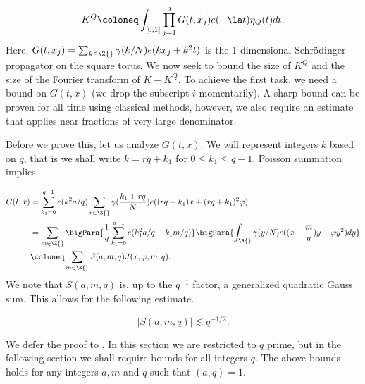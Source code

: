 \documentclass[11pt]{amsart}
\begin{document}
\begin{equation*}
    K^Q\coloneq \int_{[0,1]}\prod_{j=1}^d G(t,x_j)e(-\la t)\eta_Q(t)dt.
\end{equation*}
Here, $G(t,x_j) = \sum_{k\in\Z{}}\gamma(k/N)e(kx_j+k^2t)$ is the 1-dimensional Schr\"odinger propagator on the square torus. We now seek to bound the size of $K^{Q}$ and the size of the Fourier transform of $K - K^{Q}$. To achieve the first task, we need a bound on $G(t,x)$ (we drop the subscript $i$ momentarily). A sharp bound can be proven for all time using classical methods, however, we also require an estimate that applies near fractions of very large denominator. 


Before we prove this, let us analyze $G(t,x)$. We will represent integers $k$ based on $q$, that is we shall write $k = rq+k_1$ for $0\leq k_1\leq q-1$. Poisson summation implies

    \begin{align*}
        G(t,x)& = \sum_{k_1=0}^{q-1}e(k_1^2a/q)\sum_{r\in\Z{}}\gamma(\frac{k_1+rq}{N})e((rq+k_1)x+(rq+k_1)^2\varphi)\\
        & = \sum_{m\in\Z{}}\bigPara{\frac{1}{q}\sum_{k_1=0}^{q-1}e(k_1^2a/q-k_1m/q)}\bigPara{\int_{\R{}}\gamma(y/N)e((x+\frac{m}{q})y+\varphi y^2)dy}\\
        &\coloneq \sum_{m\in\Z{}}S(a,m,q)J(x,\varphi,m,q).
    \end{align*}
We note that $S(a,m,q)$ is, up to the $q^{-1}$ factor, a generalized quadratic Gauss sum. This allows for the following estimate.

\begin{equation}\label{2: GaussSumBoundEqn}
    |S(a,m,q)|\lesssim q^{-1/2}.
\end{equation}

We defer the proof to . In this section we are restricted to $q$ prime, but in the following section we shall require bounds for all integers $q$. The above bounds holds for any integers $a,m$ and $q$ such that $(a,q)=1$.
\end{document}
